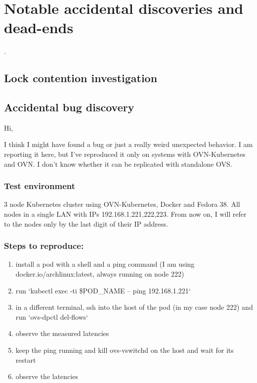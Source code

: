 \chapter{Notable accidental discoveries and dead-ends}
\label{chap:accidents}

.

\section{Lock contention investigation}


\section{Accidental bug discovery}

Hi,

I think I might have found a bug or just a really weird unexpected behavior. I am reporting it here, but I've reproduced it only on systems with OVN-Kubernetes and OVN. I don't know whether it can be replicated with standalone OVS.


\subsection{Test environment}


3 node Kubernetes cluster using OVN-Kubernetes, Docker and Fedora 38. All nodes in a single LAN with IPs 192.168.1.{221,222,223}. From now on, I will refer to the nodes only by the last digit of their IP address.


\subsection{Steps to reproduce:}


\begin{enumerate}
\item install a pod with a shell and a ping command (I am using docker.io/archlinux:latest, always running on node 222)
\item run `kubectl exec -ti \$POD\_NAME -- ping 192.168.1.221`
\item in a different terminal, ssh into the host of the pod (in my case node 222) and run `ovs-dpctl del-flows`
\item observe the measured latencies
\item keep the ping running and kill ovs-vswitchd on the host and wait for its restart
\item observe the latencies
\end{enumerate}



